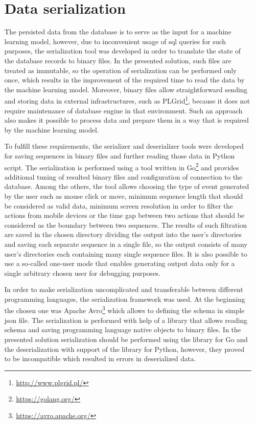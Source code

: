 \section{Data serialization}\label{sec:data-serialization}
The persisted data from the database is to serve as the input for a machine learning model, however, due to inconvenient usage of \gls{sql} queries for such purposes, the serialization tool was developed in order to translate the state of the database records to binary files.
In the presented solution, such files are treated as immutable, so the operation of serialization can be performed only once, which results in the improvement of the required time to read the data by the machine learning model.
Moreover, binary files allow straightforward sending and storing data in external infrastructures, such as PLGrid\footnote{\url{http://www.plgrid.pl/}}, because it does not require maintenance of database engine in that environment.
Such an approach also makes it possible to process data and prepare them in a way that is required by the machine learning model.

To fulfill these requirements, the serializer and deserializer tools were developed for saving sequences in binary files and further reading those data in Python script.
The serialization is performed using a tool written in Go\footnote{\url{https://golang.org/}} and provides additional tuning of resulted binary files and configuration of connection to the database.
Among the others, the tool allows choosing the type of event generated by the user such as mouse click or move, minimum sequence length that should be considered as valid data, minimum screen resolution in order to filter the actions from mobile devices or the time gap between two actions that should be considered as the boundary between two sequences.
The results of such filtration are saved in the chosen directory dividing the output into the user's directories and saving each separate sequence in a single file, so the output consists of many user's directories each containing many single sequence files.
It is also possible to use a so-called one-user mode that enables generating output data only for a single arbitrary chosen user for debugging purposes.

In order to make serialization uncomplicated and transferable between different programming languages, the serialization framework was used.
At the beginning the chosen one was Apache Avro\footnote{\url{https://avro.apache.org/}} which allows to defining the schema in simple \gls{json} file.
The serialization is performed with help of a library that allows reading schema and saving programming language native objects to binary files.
In the presented solution serialization should be performed using the library for Go and the deserialization with support of the library for Python, however, they proved to be incompatible which resulted in errors in deserialized data.

